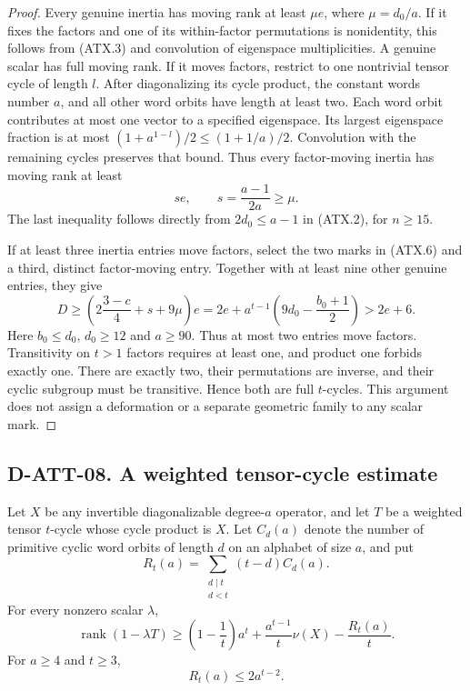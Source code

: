 \begin{proof}
Every genuine inertia has moving rank at least $\mu e$, where
$\mu=d_0/a$.  If it fixes the factors and one of its within-factor
permutations is nonidentity, this follows from (ATX.3) and convolution of
eigenspace multiplicities.  A genuine scalar has full moving rank.
If it moves factors, restrict to one nontrivial tensor cycle of
length $l$.  After diagonalizing its cycle product, the constant
words number $a$, and all other word orbits have length at least
two.  Each word orbit contributes at most one vector to a specified
eigenspace.  Its largest eigenspace fraction is at most
$(1+a^{1-l})/2\le(1+1/a)/2$.  Convolution with the remaining
cycles preserves that bound.  Thus every factor-moving inertia
has moving rank at least
\[
               s e,\qquad s=\frac{a-1}{2a}\ge\mu.
 \tag{ATX.7}
\]
The last inequality follows directly from $2d_0\le a-1$ in
(ATX.2), for $n\ge15$.

If at least three inertia entries move factors, select the two
marks in (ATX.6) and a third, distinct factor-moving entry.
Together with at least nine other genuine entries, they give
\[
 D\ge\left(2\frac{3-c}{4}+s+9\mu\right)e
   =2e+a^{t-1}\left(9d_0-\frac{b_0+1}{2}\right)>2e+6.
 \tag{ATX.8}
\]
Here $b_0\le d_0$, $d_0\ge12$ and $a\ge90$.  Thus at most two
entries move factors.  Transitivity on $t>1$ factors requires at
least one, and product one forbids exactly one.  There are exactly
two, their permutations are inverse, and their cyclic subgroup
must be transitive.  Hence both are full $t$-cycles.  This argument
does not assign a deformation or a separate geometric family to
any scalar mark.
\end{proof}

\subsection*{D-ATT-08. A weighted tensor-cycle estimate}

\begin{lemma}[D-ATT-08]
Let $X$ be any invertible diagonalizable degree-$a$ operator, and let $T$ be
a weighted tensor $t$-cycle whose cycle product is $X$.
Let $C_d(a)$ denote the number of primitive cyclic word orbits
of length $d$ on an alphabet of size $a$, and put
\[
 R_t(a)=\sum_{\substack{d\mid t\\d<t}}(t-d)C_d(a).
 \tag{ATX.9}
\]
For every nonzero scalar $\lambda$,
\[
 \operatorname{rank}(1-\lambda T)
 \ge\left(1-\frac1t\right)a^t
       +\frac{a^{t-1}}t\nu(X)-\frac{R_t(a)}t.
 \tag{ATX.10}
\]
For $a\ge4$ and $t\ge3$,
\[
                             R_t(a)\le2a^{t-2}.
 \tag{ATX.11}
\]
\end{lemma}

